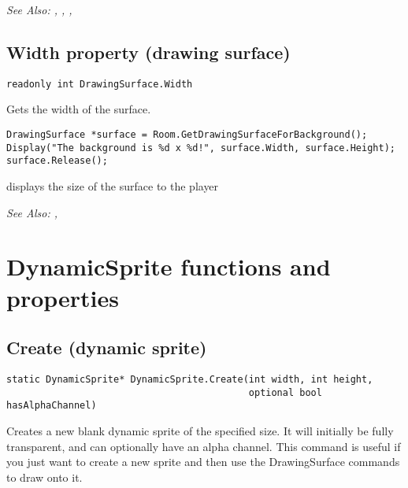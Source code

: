 \it{See Also:} , ,
,


\subsection{Width property (drawing surface)}\label{DrawingSurface.Width}%

\begin{verbatim}
readonly int DrawingSurface.Width
\end{verbatim}
Gets the width of the surface.

\begin{verbatim}
DrawingSurface *surface = Room.GetDrawingSurfaceForBackground();
Display("The background is %d x %d!", surface.Width, surface.Height);
surface.Release();
\end{verbatim}
displays the size of the surface to the player

\it{See Also:} ,



\section{DynamicSprite functions and properties}%



\subsection{Create (dynamic sprite)}\label{DynamicSprite.Create}%

\begin{verbatim}
static DynamicSprite* DynamicSprite.Create(int width, int height,
                                           optional bool hasAlphaChannel)
\end{verbatim}
Creates a new blank dynamic sprite of the specified size. It will initially be
fully transparent, and can optionally have an alpha channel. This command is
useful if you just want to create a new sprite and then use the DrawingSurface
commands to draw onto it.

